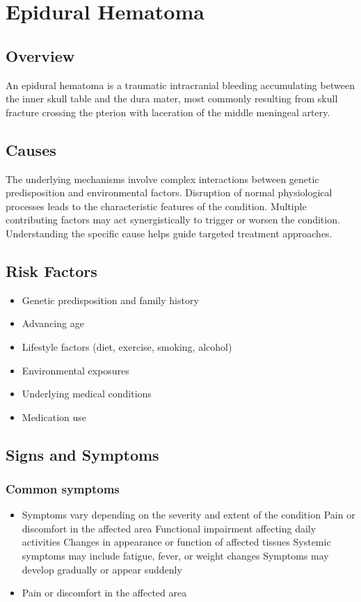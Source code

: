 \chapter{Epidural Hematoma}
\label{sec:Epidural Hematoma}

\section{Overview}
An epidural hematoma is a traumatic intracranial bleeding accumulating between the inner skull table and the dura mater, most commonly resulting from skull fracture crossing the pterion with laceration of the middle meningeal artery.
\section{Causes}
The underlying mechanisms involve complex interactions between genetic predisposition and environmental factors. Disruption of normal physiological processes leads to the characteristic features of the condition. Multiple contributing factors may act synergistically to trigger or worsen the condition. Understanding the specific cause helps guide targeted treatment approaches.
\section{Risk Factors}


\begin{itemize}[noitemsep]
  \item Genetic predisposition and family history
  \item Advancing age
  \item Lifestyle factors (diet, exercise, smoking, alcohol)
  \item Environmental exposures
  \item Underlying medical conditions
  \item Medication use
\end{itemize}
\section{Signs and Symptoms}

\subsection{Common symptoms}
\begin{itemize}[noitemsep]
  \item Symptoms vary depending on the severity and extent of the condition Pain or discomfort in the affected area Functional impairment affecting daily activities Changes in appearance or function of affected tissues Systemic symptoms may include fatigue, fever, or weight changes Symptoms may develop gradually or appear suddenly
  \item Pain or discomfort in the affected area
  \end{itemize}

